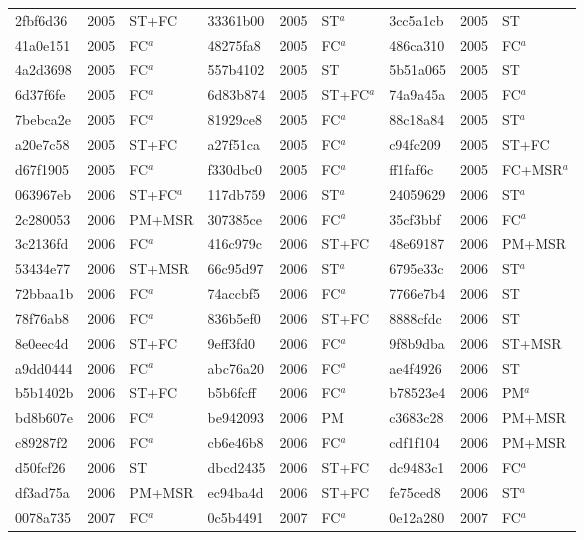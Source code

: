 \begin{longtable}{lll@{\hspace{10pt}}lll@{\hspace{10pt}}lll}
2fbf6d36 & 2005 & ST+FC & 33361b00 & 2005 & ST$^{a}$ & 3cc5a1cb & 2005 & ST \\
41a0e151 & 2005 & FC$^{a}$ & 48275fa8 & 2005 & FC$^{a}$ & 486ca310 & 2005 & FC$^{a}$ \\
4a2d3698 & 2005 & FC$^{a}$ & 557b4102 & 2005 & ST & 5b51a065 & 2005 & ST \\
6d37f6fe & 2005 & FC$^{a}$ & 6d83b874 & 2005 & ST+FC$^{a}$ & 74a9a45a & 2005 & FC$^{a}$ \\
7bebca2e & 2005 & FC$^{a}$ & 81929ce8 & 2005 & FC$^{a}$ & 88c18a84 & 2005 & ST$^{a}$ \\
a20e7c58 & 2005 & ST+FC & a27f51ca & 2005 & FC$^{a}$ & c94fc209 & 2005 & ST+FC \\
d67f1905 & 2005 & FC$^{a}$ & f330dbc0 & 2005 & FC$^{a}$ & ff1faf6c & 2005 & FC+MSR$^{a}$ \\
063967eb & 2006 & ST+FC$^{a}$ & 117db759 & 2006 & ST$^{a}$ & 24059629 & 2006 & ST$^{a}$ \\
2c280053 & 2006 & PM+MSR & 307385ce & 2006 & FC$^{a}$ & 35cf3bbf & 2006 & FC$^{a}$ \\
3c2136fd & 2006 & FC$^{a}$ & 416c979c & 2006 & ST+FC & 48e69187 & 2006 & PM+MSR \\
53434e77 & 2006 & ST+MSR & 66c95d97 & 2006 & ST$^{a}$ & 6795e33c & 2006 & ST$^{a}$ \\
72bbaa1b & 2006 & FC$^{a}$ & 74accbf5 & 2006 & FC$^{a}$ & 7766e7b4 & 2006 & ST \\
78f76ab8 & 2006 & FC$^{a}$ & 836b5ef0 & 2006 & ST+FC & 8888cfdc & 2006 & ST \\
8e0eec4d & 2006 & ST+FC & 9eff3fd0 & 2006 & FC$^{a}$ & 9f8b9dba & 2006 & ST+MSR \\
a9dd0444 & 2006 & FC$^{a}$ & abc76a20 & 2006 & FC$^{a}$ & ae4f4926 & 2006 & ST \\
b5b1402b & 2006 & ST+FC & b5b6fcff & 2006 & FC$^{a}$ & b78523e4 & 2006 & PM$^{a}$ \\
bd8b607e & 2006 & FC$^{a}$ & be942093 & 2006 & PM & c3683c28 & 2006 & PM+MSR \\
c89287f2 & 2006 & FC$^{a}$ & cb6e46b8 & 2006 & FC$^{a}$ & cdf1f104 & 2006 & PM+MSR \\
d50fcf26 & 2006 & ST & dbcd2435 & 2006 & ST+FC & dc9483c1 & 2006 & FC$^{a}$ \\
df3ad75a & 2006 & PM+MSR & ec94ba4d & 2006 & ST+FC & fe75ced8 & 2006 & ST$^{a}$ \\
0078a735 & 2007 & FC$^{a}$ & 0c5b4491 & 2007 & FC$^{a}$ & 0e12a280 & 2007 & FC$^{a}$ \\

\end{longtable}
